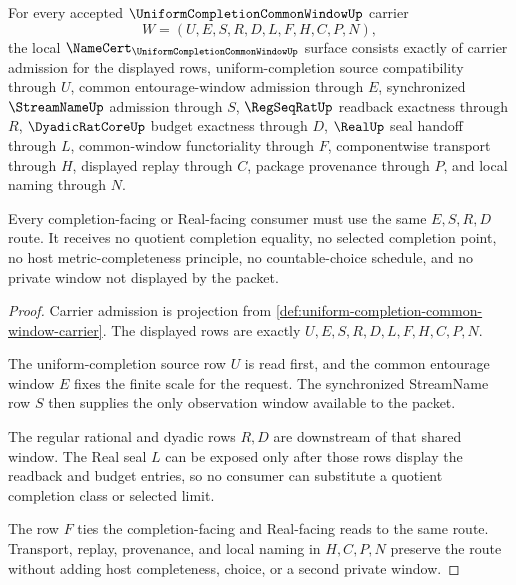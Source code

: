 \begin{theorem}
\label{thm:uniform-completion-common-window-namecert-obligations}
For every accepted $\UniformCompletionCommonWindowUp$ carrier
$$
W=(U,E,S,R,D,L,F,H,C,P,N),
$$
the local $\NameCert_{\UniformCompletionCommonWindowUp}$ surface consists exactly of carrier admission for the displayed rows, uniform-completion source compatibility through $U$, common entourage-window admission through $E$, synchronized $\StreamNameUp$ admission through $S$, $\RegSeqRatUp$ readback exactness through $R$, $\DyadicRatCoreUp$ budget exactness through $D$, $\RealUp$ seal handoff through $L$, common-window functoriality through $F$, componentwise transport through $H$, displayed replay through $C$, package provenance through $P$, and local naming through $N$.

Every completion-facing or Real-facing consumer must use the same $E,S,R,D$ route. It receives no quotient completion equality, no selected completion point, no host metric-completeness principle, no countable-choice schedule, and no private window not displayed by the packet.
\end{theorem}
\begin{proof}
Carrier admission is projection from \autoref{def:uniform-completion-common-window-carrier}. The displayed rows are exactly $U,E,S,R,D,L,F,H,C,P,N$.

The uniform-completion source row $U$ is read first, and the common entourage window $E$ fixes the finite scale for the request. The synchronized StreamName row $S$ then supplies the only observation window available to the packet.

The regular rational and dyadic rows $R,D$ are downstream of that shared window. The Real seal $L$ can be exposed only after those rows display the readback and budget entries, so no consumer can substitute a quotient completion class or selected limit.

The row $F$ ties the completion-facing and Real-facing reads to the same route. Transport, replay, provenance, and local naming in $H,C,P,N$ preserve the route without adding host completeness, choice, or a second private window.
\end{proof}

